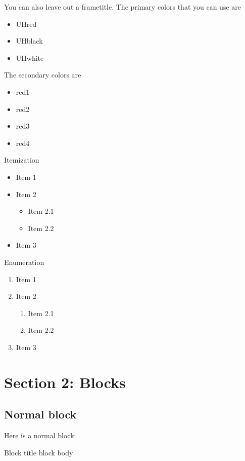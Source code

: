 \documentclass[aspectratio=169,10pt]{beamer}
\begin{document}
\begin{frame}
You can also leave out a frametitle. The primary colors that you can use are
\begin{itemize}
\item \textcolor{UHred}{UHred}
\item \textcolor{UHblack}{UHblack}
\item \colorbox{UHblack}{\textcolor{UHwhite}{UHwhite}}
\end{itemize}

The secondary colors are 
\begin{itemize}
\item \textcolor{red1}{red1}
\item \textcolor{red2}{red2}
\item \textcolor{red3}{red3}
\item \textcolor{red4}{red4}
\end{itemize}
\end{frame}

\begin{frame}{Itemization}
\begin{itemize}
\item Item 1
\item Item 2
\begin{itemize}
\item Item 2.1
\item Item 2.2
\end{itemize}
\item Item 3
\end{itemize}
\end{frame}

\begin{frame}{Enumeration}
\begin{enumerate}
\item Item 1
\item Item 2
\begin{enumerate}
\item Item 2.1
\item Item 2.2
\end{enumerate}
\item Item 3
\end{enumerate}
\end{frame}

\section{Section 2: Blocks}

\subsection{Normal block}
\begin{frame}
Here is a normal block:

\begin{block}{Block title}
block body
\end{block}
\end{frame}
\end{document}
